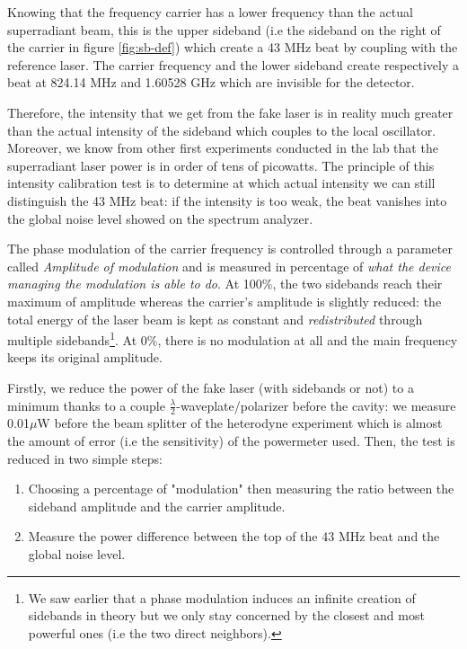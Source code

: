 \documentclass[11pt]{report}
\begin{document}
Knowing that the frequency carrier has a lower frequency than the actual superradiant beam, this is the upper sideband (i.e the sideband on the right of the carrier in figure \ref{fig:sb-def}) which create a 43 MHz beat by coupling with the reference laser. The carrier frequency and the lower sideband create respectively a beat at 824.14 MHz and 1.60528 GHz which are invisible for the detector.

Therefore, the intensity that we get from the fake laser is in reality much greater than the actual intensity of the sideband which couples to the local oscillator. Moreover, we know from other first experiments conducted in the lab that the superradiant laser power is in order of tens of picowatts. The principle of this intensity calibration test is to determine at which actual intensity we can still distinguish the 43 MHz beat: if the intensity is too weak, the beat vanishes into the global noise level showed on the spectrum analyzer.

The phase modulation of the carrier frequency is controlled through a parameter called \textit{Amplitude of modulation} and is measured in percentage of \textit{what the device managing the modulation is able to do}. At 100\%, the two sidebands reach their maximum of amplitude whereas the carrier's amplitude is slightly reduced: the total energy of the laser beam is kept as constant and \textit{redistributed} through multiple sidebands\footnote{We saw earlier that a phase modulation induces an infinite creation of sidebands in theory but we only stay concerned by the closest and most powerful ones (i.e the two direct neighbors).}. At 0\%, there is no modulation at all and the main frequency keeps its original amplitude.

Firstly, we reduce the power of the fake laser (with sidebands or not) to a minimum thanks to a couple $\frac{\lambda}{2}$-waveplate/polarizer before the cavity: we measure 0.01$\mu$W before the beam splitter of the heterodyne experiment which is almost the amount of error (i.e the sensitivity) of the powermeter used. Then, the test is reduced in two simple steps:
\begin{enumerate}
	\item Choosing a percentage of "modulation" then measuring the ratio between the sideband amplitude and the carrier amplitude.
	\item Measure the power difference between the top of the 43 MHz beat and the global noise level.
\end{enumerate}
\end{document}

